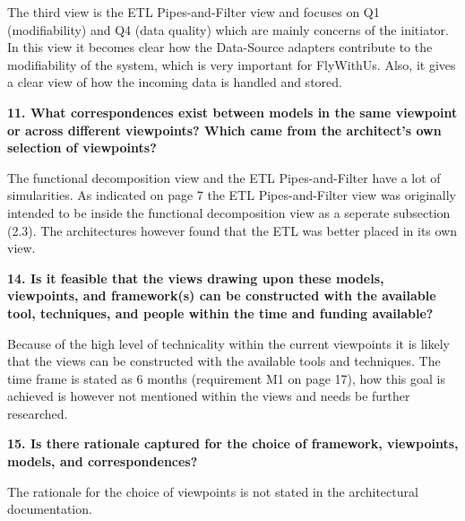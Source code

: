 The third view is the ETL Pipes-and-Filter view and focuses on Q1 (modifiability) and Q4 (data quality) which are mainly concerns of the initiator. In this view it becomes clear how the Data-Source adapters contribute to the modifiability of the system, which is very important for FlyWithUs. Also, it gives a clear view of how the incoming data is handled and stored. 
\vspace{.5cm}

\textbf{11. What correspondences exist between models in the same viewpoint or across different viewpoints? Which came from the architect's own selection of viewpoints?}

The functional decomposition view and the ETL Pipes-and-Filter have a lot of simularities. As indicated on page 7 the ETL Pipes-and-Filter view was originally intended to be inside the functional decomposition view as a seperate subsection (2.3). The architectures however found that the ETL was better placed in its own view. 

\vspace{.5cm}

\textbf{14. Is it feasible that the views drawing upon these models, viewpoints, and framework(s) can be constructed with the available tool, techniques, and people within the time and funding available?}

Because of the high level of technicality within the current viewpoints it is likely that the views can be constructed with the available tools and techniques. The time frame is stated as 6 months (requirement M1 on page 17), how this goal is achieved is however not mentioned within the views and needs be further researched. 
\vspace{.5cm}

\textbf{15. Is there rationale captured for the choice of framework, viewpoints, models, and correspondences?}

The rationale for the choice of viewpoints is not stated in the architectural documentation.